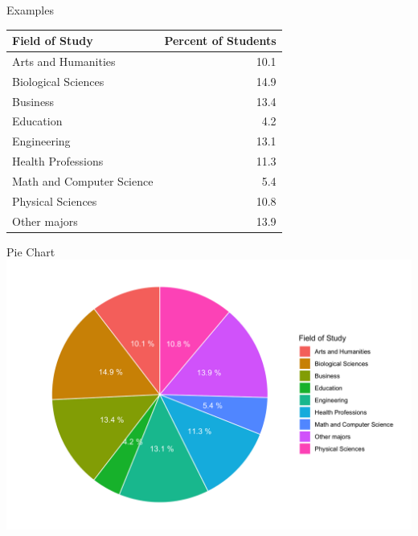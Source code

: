 \documentclass{beamer}
\begin{document}
\begin{frame}{Examples}
    \begin{center}
    \begin{tabular}{|l|r|}
        \hline
        \textbf{Field of Study} & \textbf{Percent of Students}\\
        \hline
        Arts and Humanities & 10.1\\
        \hline
        Biological Sciences & 14.9\\
        \hline
        Business & 13.4\\
        \hline
        Education & 4.2\\
        \hline
        Engineering & 13.1\\
        \hline
        Health Professions & 11.3\\
        \hline
        Math and Computer Science & 5.4\\
        \hline
        Physical Sciences & 10.8\\
        \hline
        Other majors & 13.9\\
        \hline 
    \end{tabular}
    \end{center}
\end{frame}

\begin{frame}{Pie Chart}
    \includegraphics[width= \linewidth]{pie.png}
\end{frame}
\end{document}
